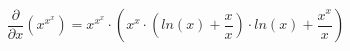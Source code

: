 \documentclass[a4paper,14pt]{article}
\begin{document}
    $$\frac{\partial}{\partial x} (x^{x^x}) = x^{x^x} \cdot (x^x \cdot (ln(x)+ \frac{x}{x }) \cdot ln(x)+ \frac{x^x}{x })$$
\end{document}
